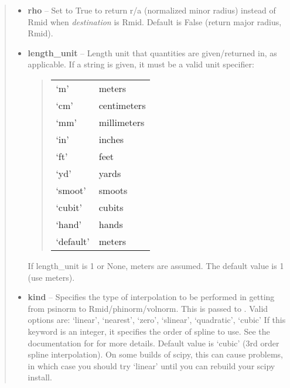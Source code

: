 \documentclass[letterpaper,10pt,english]{sphinxmanual}
\begin{document}
\begin{fulllineitems}
\begin{fulllineitems}
\begin{quote}
\begin{description}
\begin{itemize}
\item {} 
\textbf{rho} -- Set to True to return r/a (normalized minor radius)
instead of Rmid when \emph{destination} is Rmid. Default is False
(return major radius, Rmid).

\item {} 
\textbf{length\_unit} -- 
Length unit that quantities are
given/returned in, as applicable. If a string is given, it must
be a valid unit specifier:
\begin{quote}

\begin{tabulary}{\linewidth}{|L|L|}
\hline

`m'
 & 
meters
\\

`cm'
 & 
centimeters
\\

`mm'
 & 
millimeters
\\

`in'
 & 
inches
\\

`ft'
 & 
feet
\\

`yd'
 & 
yards
\\

`smoot'
 & 
smoots
\\

`cubit'
 & 
cubits
\\

`hand'
 & 
hands
\\

`default'
 & 
meters
\\
\hline\end{tabulary}

\end{quote}

If length\_unit is 1 or None, meters are assumed. The default
value is 1 (use meters).


\item {} 
\textbf{kind} -- Specifies the type of
interpolation to be performed in getting from psinorm to
Rmid/phinorm/volnorm. This is passed to
. Valid options are:
`linear', `nearest', `zero', `slinear', `quadratic', `cubic'
If this keyword is an integer, it specifies the order of spline
to use. See the documentation for  for more
details. Default value is `cubic' (3rd order spline
interpolation). On some builds of scipy, this can cause problems,
in which case you should try `linear' until you can rebuild your
scipy install.


\end{itemize}
\end{description}
\end{quote}
\end{fulllineitems}
\end{fulllineitems}
\end{document}

